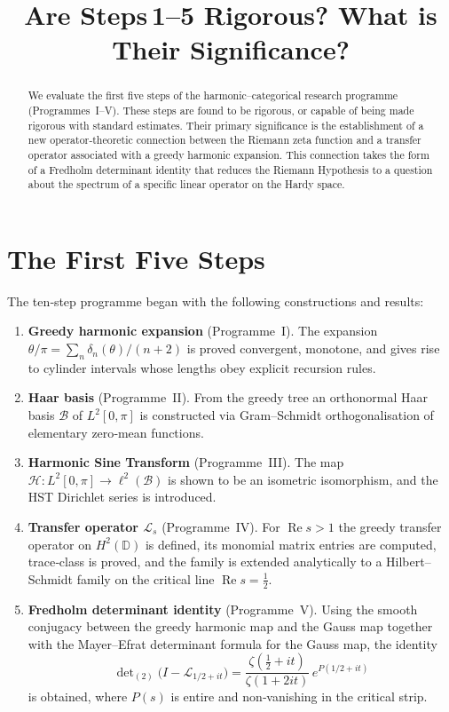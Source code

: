 \documentclass[11pt,a4paper]{article}
\title{\bfseries Are Steps\,1--5 Rigorous?  What is Their Significance?}
\author{}
\date{}
\begin{document}
\maketitle

\begin{abstract}
We evaluate the first five steps of the harmonic–categorical research programme (Programmes~I–V).  These steps are found to be rigorous, or capable of being made rigorous with standard estimates.  Their primary significance is the establishment of a new operator‑theoretic connection between the Riemann zeta function and a transfer operator associated with a greedy harmonic expansion.  This connection takes the form of a Fredholm determinant identity that reduces the Riemann Hypothesis to a question about the spectrum of a specific linear operator on the Hardy space.
\end{abstract}

\section{The First Five Steps}
The ten‑step programme began with the following constructions and results:
\begin{enumerate}
\item \textbf{Greedy harmonic expansion} (Programme~I).  The expansion \(\theta/\pi=\sum_{n}\delta_n(\theta)/(n+2)\) is proved convergent, monotone, and gives rise to cylinder intervals whose lengths obey explicit recursion rules.
\item \textbf{Haar basis} (Programme~II).  From the greedy tree an orthonormal Haar basis \(\mathcal{B}\) of \(L^2[0,\pi]\) is constructed via Gram–Schmidt orthogonalisation of elementary zero‑mean functions.
\item \textbf{Harmonic Sine Transform} (Programme~III).  The map \(\mathcal{H}:L^2[0,\pi]\to\ell^2(\mathcal{B})\) is shown to be an isometric isomorphism, and the HST Dirichlet series is introduced.
\item \textbf{Transfer operator \(\mathcal{L}_s\)} (Programme~IV).  For \(\operatorname{Re}s>1\) the greedy transfer operator on \(H^2(\mathbb{D})\) is defined, its monomial matrix entries are computed, trace‑class is proved, and the family is extended analytically to a Hilbert–Schmidt family on the critical line \(\operatorname{Re}s=\frac12\).
\item \textbf{Fredholm determinant identity} (Programme~V).  Using the smooth conjugacy between the greedy harmonic map and the Gauss map together with the Mayer–Efrat determinant formula for the Gauss map, the identity
\[
\det\nolimits_{(2)}\!\big(I-\mathcal{L}_{1/2+it}\big)
= \frac{\zeta(\tfrac12+it)}{\zeta(1+2it)}\, e^{P(1/2+it)}
\]
is obtained, where \(P(s)\) is entire and non‑vanishing in the critical strip.
\end{enumerate}
\end{document}
